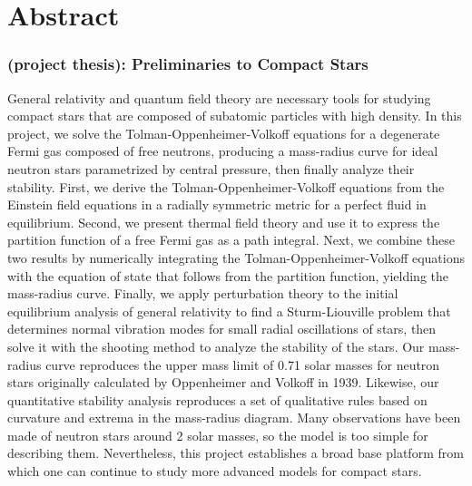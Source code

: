\chapter{Abstract}

\subsection*{ (project thesis): Preliminaries to Compact Stars}

General relativity and quantum field theory are necessary tools for studying compact stars
that are composed of subatomic particles with high density.
In this project, we solve the Tolman-Oppenheimer-Volkoff equations for a degenerate Fermi gas composed of free neutrons,
producing a mass-radius curve for ideal neutron stars parametrized by central pressure, then finally analyze their stability.
First, we derive the Tolman-Oppenheimer-Volkoff equations from the Einstein field equations
in a radially symmetric metric for a perfect fluid in equilibrium.
Second, we present thermal field theory and use it
to express the partition function of a free Fermi gas as a path integral.
Next, we combine these two results by numerically integrating the Tolman-Oppenheimer-Volkoff equations
with the equation of state that follows from the partition function, yielding the mass-radius curve.
Finally, we apply perturbation theory to the initial equilibrium analysis of general relativity
to find a Sturm-Liouville problem that determines normal vibration modes for small radial oscillations of stars,
then solve it with the shooting method to analyze the stability of the stars.
Our mass-radius curve reproduces the upper mass limit of 0.71 solar masses
for neutron stars originally calculated by Oppenheimer and Volkoff in 1939.
Likewise, our quantitative stability analysis reproduces
a set of qualitative rules based on curvature and extrema in the mass-radius diagram.
Many observations have been made of neutron stars around 2 solar masses,
so the model is too simple for describing them.
Nevertheless, this project establishes a broad base platform
from which one can continue to study more advanced models for compact stars.


